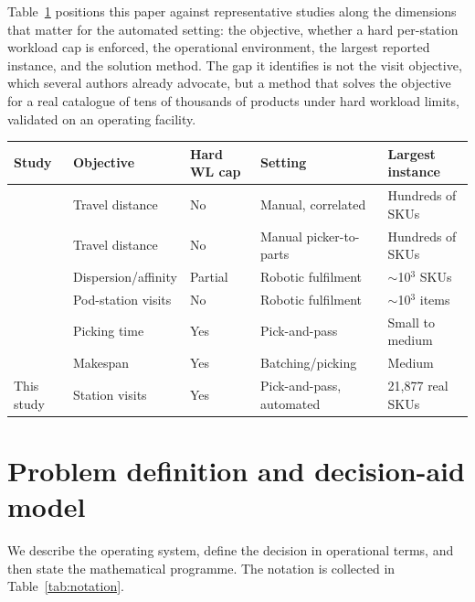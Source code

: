 \documentclass[]{interact}
\begin{document}
Table~\ref{tab:litreview} positions this paper against representative studies along the dimensions that matter for the automated setting: the objective, whether a hard per-station workload cap is enforced, the operational environment, the largest reported instance, and the solution method. The gap it identifies is not the visit objective, which several authors already advocate, but a method that solves the objective for a real catalogue of tens of thousands of products under hard workload limits, validated on an operating facility.

\begin{table}[t]
\centering
{}
{\begin{tabular}{@{}lllll@{}}
\toprule
Study & Objective & Hard WL cap & Setting & Largest instance \\
\midrule
\citet{zhang2019cie}   & Travel distance       & No   & Manual, correlated      & Hundreds of SKUs \\
\citet{wang2020}       & Travel distance       & No   & Manual picker-to-parts  & Hundreds of SKUs \\
\citet{mirzaei2021}    & Dispersion/affinity   & Partial & Robotic fulfilment   & $\sim$10$^3$ SKUs \\
\citet{xie2021}        & Pod-station visits    & No   & Robotic fulfilment      & $\sim$10$^3$ items \\
\citet{tarczynski2023} & Picking time          & Yes  & Pick-and-pass           & Small to medium \\
\citet{muter2022}      & Makespan              & Yes  & Batching/picking        & Medium \\
This study             & Station visits        & Yes  & Pick-and-pass, automated & 21,877 real SKUs \\
\bottomrule
\end{tabular}}
\label{tab:litreview}
\end{table}

\section{Problem definition and decision-aid model}\label{sec:model}
We describe the operating system, define the decision in operational terms, and then state the mathematical programme. The notation is collected in Table~\ref{tab:notation}.
\end{document}
